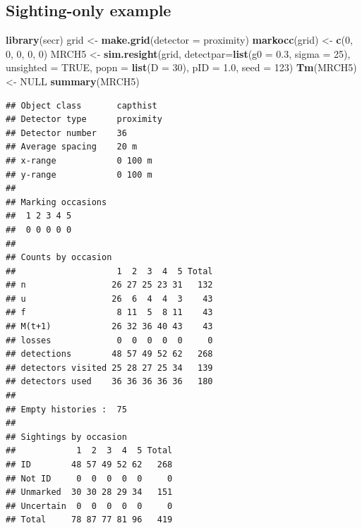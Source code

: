 \documentclass[
]{book}
\newenvironment{Shaded}{\begin{snugshade}}{\end{snugshade}}
\newcommand{\AttributeTok}[1]{\textcolor[rgb]{0.13,0.29,0.53}{#1}}
\newcommand{\ConstantTok}[1]{\textcolor[rgb]{0.56,0.35,0.01}{#1}}
\newcommand{\DecValTok}[1]{\textcolor[rgb]{0.00,0.00,0.81}{#1}}
\newcommand{\FloatTok}[1]{\textcolor[rgb]{0.00,0.00,0.81}{#1}}
\newcommand{\FunctionTok}[1]{\textcolor[rgb]{0.13,0.29,0.53}{\textbf{#1}}}
\newcommand{\NormalTok}[1]{#1}
\newcommand{\OtherTok}[1]{\textcolor[rgb]{0.56,0.35,0.01}{#1}}
\newcommand{\StringTok}[1]{\textcolor[rgb]{0.31,0.60,0.02}{#1}}
\begin{document}
\subsection{Sighting-only example}\label{appendix6}

\begin{Shaded}
\begin{Highlighting}[]
\FunctionTok{library}\NormalTok{(secr)}
\NormalTok{grid }\OtherTok{\textless{}{-}} \FunctionTok{make.grid}\NormalTok{(}\AttributeTok{detector =} \StringTok{\textquotesingle{}proximity\textquotesingle{}}\NormalTok{)}
\FunctionTok{markocc}\NormalTok{(grid) }\OtherTok{\textless{}{-}} \FunctionTok{c}\NormalTok{(}\DecValTok{0}\NormalTok{, }\DecValTok{0}\NormalTok{, }\DecValTok{0}\NormalTok{, }\DecValTok{0}\NormalTok{, }\DecValTok{0}\NormalTok{)}
\NormalTok{MRCH5 }\OtherTok{\textless{}{-}} \FunctionTok{sim.resight}\NormalTok{(grid, }\AttributeTok{detectpar=}\FunctionTok{list}\NormalTok{(}\AttributeTok{g0 =} \FloatTok{0.3}\NormalTok{, }\AttributeTok{sigma =} \DecValTok{25}\NormalTok{), }
           \AttributeTok{unsighted =} \ConstantTok{TRUE}\NormalTok{, }\AttributeTok{popn =} \FunctionTok{list}\NormalTok{(}\AttributeTok{D =} \DecValTok{30}\NormalTok{), }\AttributeTok{pID =} \FloatTok{1.0}\NormalTok{, }\AttributeTok{seed =} \DecValTok{123}\NormalTok{)}
\FunctionTok{Tm}\NormalTok{(MRCH5) }\OtherTok{\textless{}{-}} \ConstantTok{NULL}
\FunctionTok{summary}\NormalTok{(MRCH5)}
\end{Highlighting}
\end{Shaded}

\begin{verbatim}
## Object class       capthist 
## Detector type      proximity 
## Detector number    36 
## Average spacing    20 m 
## x-range            0 100 m 
## y-range            0 100 m 
## 
## Marking occasions
##  1 2 3 4 5
##  0 0 0 0 0
## 
## Counts by occasion 
##                    1  2  3  4  5 Total
## n                 26 27 25 23 31   132
## u                 26  6  4  4  3    43
## f                  8 11  5  8 11    43
## M(t+1)            26 32 36 40 43    43
## losses             0  0  0  0  0     0
## detections        48 57 49 52 62   268
## detectors visited 25 28 27 25 34   139
## detectors used    36 36 36 36 36   180
## 
## Empty histories :  75 
## 
## Sightings by occasion 
##            1  2  3  4  5 Total
## ID        48 57 49 52 62   268
## Not ID     0  0  0  0  0     0
## Unmarked  30 30 28 29 34   151
## Uncertain  0  0  0  0  0     0
## Total     78 87 77 81 96   419
\end{verbatim}
\end{document}
